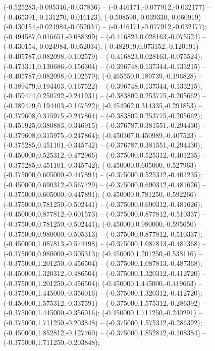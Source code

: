  (-0.525283,-0.095346,-0.037836) -- (-0.446171,-0.077912,-0.032177) -- (-0.465391,-0.131270,-0.016123);
 (-0.508590,-0.039330,-0.060919) -- (-0.430154,-0.024984,-0.052034) -- (-0.446171,-0.077912,-0.032177);
 (-0.494587,0.016651,-0.088399) -- (-0.416823,0.028163,-0.075524) -- (-0.430154,-0.024984,-0.052034);
 (-0.482919,0.073152,-0.120191) -- (-0.405787,0.082098,-0.102579) -- (-0.416823,0.028163,-0.075524);
 (-0.473311,0.130686,-0.156304) -- (-0.396748,0.137344,-0.133215) -- (-0.405787,0.082098,-0.102579);
 (-0.465550,0.189739,-0.196828) -- (-0.389479,0.194403,-0.167522) -- (-0.396748,0.137344,-0.133215);
 (-0.459474,0.250792,-0.241931) -- (-0.383809,0.253775,-0.205662) -- (-0.389479,0.194403,-0.167522);
 (-0.454962,0.314335,-0.291853) -- (-0.379608,0.315975,-0.247864) -- (-0.383809,0.253775,-0.205662);
 (-0.451925,0.380883,-0.346915) -- (-0.376787,0.381551,-0.294430) -- (-0.379608,0.315975,-0.247864);
 (-0.450307,0.450989,-0.407523) -- (-0.375285,0.451101,-0.345742) -- (-0.376787,0.381551,-0.294430);
 (-0.450000,0.525312,-0.472966) -- (-0.375000,0.525312,-0.401235) -- (-0.375285,0.451101,-0.345742);
 (-0.450000,0.605000,-0.527963) -- (-0.375000,0.605000,-0.447891) -- (-0.375000,0.525312,-0.401235);
 (-0.450000,0.690312,-0.567729) -- (-0.375000,0.690312,-0.481626) -- (-0.375000,0.605000,-0.447891);
 (-0.450000,0.781250,-0.592266) -- (-0.375000,0.781250,-0.502441) -- (-0.375000,0.690312,-0.481626);
 (-0.450000,0.877812,-0.601573) -- (-0.375000,0.877812,-0.510337) -- (-0.375000,0.781250,-0.502441);
 (-0.450000,0.980000,-0.595650) -- (-0.375000,0.980000,-0.505313) -- (-0.375000,0.877812,-0.510337);
 (-0.450000,1.087813,-0.574498) -- (-0.375000,1.087813,-0.487368) -- (-0.375000,0.980000,-0.505313);
 (-0.450000,1.201250,-0.538116) -- (-0.375000,1.201250,-0.456504) -- (-0.375000,1.087813,-0.487368);
 (-0.450000,1.320312,-0.486504) -- (-0.375000,1.320312,-0.412720) -- (-0.375000,1.201250,-0.456504);
 (-0.450000,1.445000,-0.419663) -- (-0.375000,1.445000,-0.356016) -- (-0.375000,1.320312,-0.412720);
 (-0.450000,1.575312,-0.337591) -- (-0.375000,1.575312,-0.286392) -- (-0.375000,1.445000,-0.356016);
 (-0.450000,1.711250,-0.240291) -- (-0.375000,1.711250,-0.203848) -- (-0.375000,1.575312,-0.286392);
 (-0.450000,1.852812,-0.127760) -- (-0.375000,1.852812,-0.108384) -- (-0.375000,1.711250,-0.203848);
